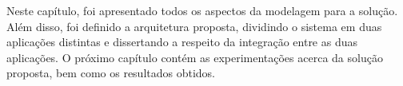 Neste capítulo, foi apresentado todos os aspectos da modelagem para a solução. Além disso, foi definido a arquitetura proposta, dividindo o sistema em duas aplicações distintas e dissertando a respeito da integração entre as duas aplicações. O próximo capítulo contém as experimentações acerca da solução proposta, bem como os resultados obtidos.























